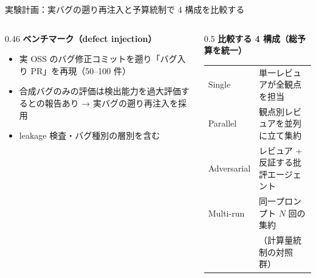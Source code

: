 \documentclass[10pt, aspectratio=169, t]{beamer}
\begin{document}
\begin{frame}{実験計画：実バグの遡り再注入と予算統制で 4 構成を比較する}
    \begin{columns}[T]
        \begin{column}{0.46\textwidth}
            \textbf{ベンチマーク（defect injection）}
            \begin{itemize}
                \item 実 OSS のバグ修正コミットを遡り「バグ入り PR」を再現（50--100 件）
                \item 合成バグのみの評価は検出能力を過大評価するとの報告あり → \alert{実バグの遡り再注入}を採用
                \item leakage 検査・バグ種別の層別を含む
            \end{itemize}
        \end{column}
        \begin{column}{0.5\textwidth}
            \textbf{比較する 4 構成（総予算を統一）}
            \vspace{2pt}
            {\small
            \begin{tabularx}{\textwidth}{lX}
                \toprule
                Single & 単一レビュアが全観点を担当 \\
                Parallel & 観点別レビュアを並列に立て集約 \\
                Adversarial & レビュア + 反証する批評エージェント \\
                Multi-run & 同一プロンプト $N$ 回の集約\\
                & （\alert{計算量統制の対照群}） \\
                \bottomrule
            \end{tabularx}
            }
        \end{column}
    \end{columns}
    \vspace{6pt}
    \begin{center}
    \end{center}
\end{frame}
\end{document}
